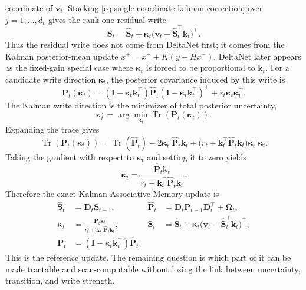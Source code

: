 \documentclass[11pt]{article}
\newcommand{\ve}[1]{\boldsymbol{#1}}
\newcommand{\tr}{\intercal}
\DeclareMathOperator{\Trace}{Tr}
\begin{document}
coordinate of $\ve{v}_t$. Stacking \eqref{eq:single-coordinate-kalman-correction} over
$j=1,\ldots,d_v$ gives the rank-one residual write
\begin{equation}
  \ve{S}_t
  =
  \widehat{\ve{S}}_t
  +
  \ve{\kappa}_t
  \big(\ve{v}_t-\widehat{\ve{S}}_t^{\tr}\ve{k}_t\big)^{\tr}.
  \label{eq:kam-residual-write}
\end{equation}
Thus the residual write does not come from DeltaNet first; it comes from the Kalman
posterior-mean update $x^+=x^-+K(y-Hx^-)$. DeltaNet later appears as the fixed-gain special
case where $\ve{\kappa}_t$ is forced to be proportional to $\ve{k}_t$.
For a candidate write direction $\ve{\kappa}_t$, the posterior covariance induced by this
write is
\begin{equation}
  \ve{P}_t(\ve{\kappa}_t)
  =
  (\ve{I}-\ve{\kappa}_t\ve{k}_t^{\tr})
  \widehat{\ve{P}}_t
  (\ve{I}-\ve{\kappa}_t\ve{k}_t^{\tr})^{\tr}
  +
  r_t\ve{\kappa}_t\ve{\kappa}_t^{\tr}.
  \label{eq:kam-candidate-cov}
\end{equation}
The Kalman write direction is the minimizer of total posterior uncertainty,
\begin{equation}
  \ve{\kappa}_t^\star
  =
  \arg\min_{\ve{\kappa}_t}
  \Trace\!\left(\ve{P}_t(\ve{\kappa}_t)\right).
  \label{eq:kam-trace-objective}
\end{equation}
Expanding the trace gives
\begin{equation}
  \Trace\!\left(\ve{P}_t(\ve{\kappa}_t)\right)
  =
  \Trace(\widehat{\ve{P}}_t)
  -2\ve{\kappa}_t^{\tr}\widehat{\ve{P}}_t\ve{k}_t
  +
  \big(r_t+\ve{k}_t^{\tr}\widehat{\ve{P}}_t\ve{k}_t\big)
  \ve{\kappa}_t^{\tr}\ve{\kappa}_t .
  \label{eq:kam-trace-expanded}
\end{equation}
Taking the gradient with respect to $\ve{\kappa}_t$ and setting it to zero yields
\begin{equation}
  \boxed{
  \ve{\kappa}_t
  =
  \frac{\widehat{\ve{P}}_t\ve{k}_t}
  {r_t+\ve{k}_t^{\tr}\widehat{\ve{P}}_t\ve{k}_t}
  }.
  \label{eq:kam-optimal-gain}
\end{equation}
Therefore the exact Kalman Associative Memory update is
\begin{equation}
\begin{aligned}
  \widehat{\ve{S}}_t
  &=\ve{D}_t\ve{S}_{t-1},
  &
  \widehat{\ve{P}}_t
  &=\ve{D}_t\ve{P}_{t-1}\ve{D}_t^{\tr}+\ve{\Omega}_t,
  \\
  \ve{\kappa}_t
  &=
  \frac{\widehat{\ve{P}}_t\ve{k}_t}
  {r_t+\ve{k}_t^{\tr}\widehat{\ve{P}}_t\ve{k}_t},
  &
  \ve{S}_t
  &=
  \widehat{\ve{S}}_t
  +
  \ve{\kappa}_t
  \big(\ve{v}_t-\widehat{\ve{S}}_t^{\tr}\ve{k}_t\big)^{\tr},
  \\
  \ve{P}_t
  &=
  (\ve{I}-\ve{\kappa}_t\ve{k}_t^{\tr})\widehat{\ve{P}}_t.
\end{aligned}
\label{eq:kam-optimal-update}
\end{equation}
This is the reference update. The remaining question is which part of it can be made
tractable and scan-computable without losing the link between uncertainty, transition, and
write strength.
\end{document}
